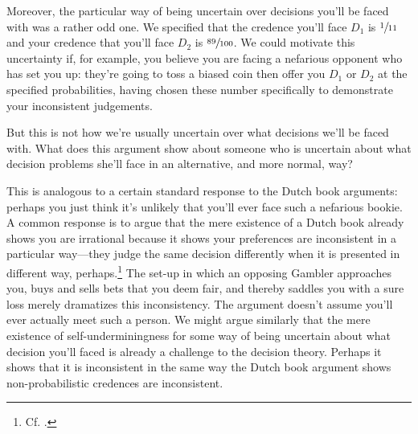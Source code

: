 \documentclass[a4paper]{article}
\newenvironment{CCM rewritten}
{\begingroup\color{blue}} %
{\endgroup}              %
\begin{document}
{
Moreover, the particular way of being uncertain over decisions you'll be faced with was a rather odd one. We specified that the credence you'll face $D_1$ is $\sfrac{1}{11}$ and your credence that you'll face $D_2$ is $\sfrac{89}{100}$. 
We could motivate this uncertainty if, for example, you believe you are facing a nefarious opponent who has set you up: they're going to toss a biased coin then offer you $D_1$ or $D_2$ at the specified probabilities, having chosen these number specifically to demonstrate your inconsistent judgements. 

But this is not how we're usually uncertain over what decisions we'll be faced with. 
What does this argument show about someone who is uncertain about what decision problems she'll face in an alternative, and more normal, way? 

This is analogous to a certain standard response to the Dutch book arguments: perhaps you just think it's unlikely that you'll ever face such a nefarious bookie. A common response is to argue that the mere existence of a Dutch book already shows you are irrational because it shows your preferences are inconsistent in a particular way---they judge the same decision differently when it is presented in different way, perhaps.\footnote{Cf. \citep{armendt1993db,mahtani2014db}.} %
{The set-up in which an opposing Gambler approaches you, buys and sells bets that you deem fair, and thereby saddles you with a sure loss merely dramatizes this inconsistency.} The argument doesn't assume you'll ever actually meet such a person. We might argue similarly that the mere existence of self-underminingness for some way of being uncertain about what decision you'll faced is already a challenge to the decision theory. Perhaps it shows that it is inconsistent in the same way the Dutch book argument shows non-probabilistic credences are inconsistent.

}
\end{document}
